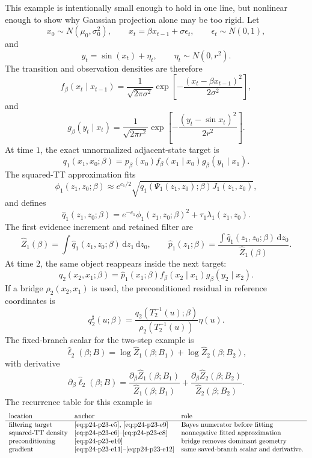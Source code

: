 \documentclass[11pt]{article}
\newcommand{\dd}{\,\mathrm d}
\begin{document}
This example is intentionally small enough to hold in one line, but nonlinear
enough to show why Gaussian projection alone may be too rigid.  Let
\[
    x_0\sim N(\mu_0,\sigma_0^2),
    \qquad
    x_t=\beta x_{t-1}+\sigma\epsilon_t,
    \qquad
    \epsilon_t\sim N(0,1),
    \label{eq:p24-p23-e1}
\]
and
\[
    y_t=\sin(x_t)+\eta_t,
    \qquad
    \eta_t\sim N(0,r^2).
    \label{eq:p24-p23-e2}
\]
The transition and observation densities are therefore
\[
    f_\beta(x_t\mid x_{t-1})
    =
    \frac{1}{\sqrt{2\pi\sigma^2}}
    \exp\!\left[-\frac{(x_t-\beta x_{t-1})^2}{2\sigma^2}\right],
    \label{eq:p24-p23-e3}
\]
and
\[
    g_\beta(y_t\mid x_t)
    =
    \frac{1}{\sqrt{2\pi r^2}}
    \exp\!\left[-\frac{(y_t-\sin x_t)^2}{2r^2}\right].
    \label{eq:p24-p23-e4}
\]
At time \(1\), the exact unnormalized adjacent-state target is
\[
    q_1(x_1,x_0;\beta)
    =
    p_\beta(x_0)
    f_\beta(x_1\mid x_0)
    g_\beta(y_1\mid x_1).
    \label{eq:p24-p23-e5}
\]
The squared-TT approximation fits
\[
    \phi_1(z_1,z_0;\beta)
    \approx
    e^{c_1/2}
    \sqrt{
    q_1(\Psi_1(z_1,z_0);\beta)
    J_1(z_1,z_0)},
    \label{eq:p24-p23-e6}
\]
and defines
\[
    \widehat q_1(z_1,z_0;\beta)
    =
    e^{-c_1}\phi_1(z_1,z_0;\beta)^2
    +
    \tau_1\lambda_1(z_1,z_0).
    \label{eq:p24-p23-e7}
\]
The first evidence increment and retained filter are
\[
    \widehat Z_1(\beta)
    =
    \int\widehat q_1(z_1,z_0;\beta)\dd z_1\dd z_0,
    \qquad
    \widehat p_1(z_1;\beta)
    =
    \frac{\int\widehat q_1(z_1,z_0;\beta)\dd z_0}
    {\widehat Z_1(\beta)}.
    \label{eq:p24-p23-e8}
\]
At time \(2\), the same object reappears inside the next target:
\[
    q_2(x_2,x_1;\beta)
    =
    \widehat p_1(x_1;\beta)
    f_\beta(x_2\mid x_1)
    g_\beta(y_2\mid x_2).
    \label{eq:p24-p23-e9}
\]
If a bridge \(\rho_2(x_2,x_1)\) is used, the preconditioned residual in
reference coordinates is
\[
    q_2^\sharp(u;\beta)
    =
    \frac{q_2(T_2^{-1}(u);\beta)}
    {\rho_2(T_2^{-1}(u))}
    \eta(u).
    \label{eq:p24-p23-e10}
\]
The fixed-branch scalar for the two-step example is
\[
    \widehat\ell_2(\beta;B)
    =
    \log\widehat Z_1(\beta;B_1)
    +
    \log\widehat Z_2(\beta;B_2),
    \label{eq:p24-p23-e11}
\]
with derivative
\[
    \partial_\beta\widehat\ell_2(\beta;B)
    =
    \frac{\partial_\beta\widehat Z_1(\beta;B_1)}
    {\widehat Z_1(\beta;B_1)}
    +
    \frac{\partial_\beta\widehat Z_2(\beta;B_2)}
    {\widehat Z_2(\beta;B_2)}.
    \label{eq:p24-p23-e12}
\]
The recurrence table for this example is
\[
\begin{array}{lll}
\text{location} & \text{anchor} & \text{role}\\
\hline
\text{filtering target} & \text{\eqref{eq:p24-p23-e5}, \eqref{eq:p24-p23-e9}} &
    \text{Bayes numerator before fitting}\\
\text{squared-TT density} & \text{\eqref{eq:p24-p23-e6}--\eqref{eq:p24-p23-e8}} &
    \text{nonnegative fitted approximation}\\
\text{preconditioning} & \text{\eqref{eq:p24-p23-e10}} &
    \text{bridge removes dominant geometry}\\
\text{gradient} & \text{\eqref{eq:p24-p23-e11}--\eqref{eq:p24-p23-e12}} &
    \text{same saved-branch scalar and derivative.}
\end{array}
\label{eq:p24-p23-e13}
\]
\end{document}
